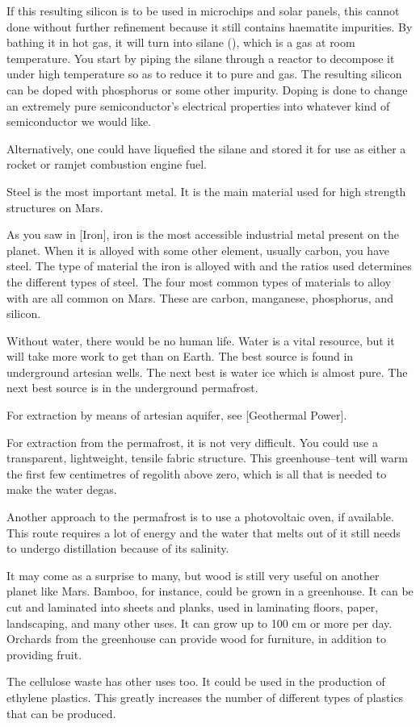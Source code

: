 If this resulting silicon is to be used in microchips and solar panels, this cannot done without further refinement because it still contains haematite impurities. By bathing it in hot  gas, it will turn into silane (), which is a gas at room temperature. You start by piping the silane through a reactor to decompose it under high temperature so as to reduce it to pure  and  gas. The resulting silicon can be doped with phosphorus or some other impurity. Doping is done to change an extremely pure semiconductor's electrical properties into whatever kind of semiconductor we would like.

Alternatively, one could have liquefied the silane and stored it for use as either a rocket or ramjet combustion engine fuel.

Steel is the most important metal. It is the main material used for high strength structures on Mars. 

As you saw in [Iron], iron is the most accessible industrial metal present on the planet. When it is alloyed with some other element, usually carbon, you have steel. The type of material the iron is alloyed with and the ratios used determines the different types of steel. The four most common types of materials to alloy with are all common on Mars. These are carbon, manganese, phosphorus, and silicon.

Without water, there would be no human life. Water is a vital resource, but it will take more work to get than on Earth. The best source is found in underground artesian wells. The next best is water ice which is almost pure. The next best source is in the underground permafrost.

For extraction by means of artesian aquifer, see [Geothermal Power].

For extraction from the permafrost, it is not very difficult. You could use a transparent, lightweight, tensile fabric structure. This greenhouse--tent will warm the first few centimetres of regolith above zero, which is all that is needed to make the water degas. 

Another approach to the permafrost is to use a photovoltaic oven, if available. This route requires a lot of energy and the water that melts out of it still needs to undergo distillation because of its salinity.

It may come as a surprise to many, but wood is still very useful on another planet like Mars. Bamboo, for instance, could be grown in a greenhouse. It can be cut and laminated into sheets and planks, used in laminating floors, paper, landscaping, and many other uses. It can grow up to 100 cm or more per day. Orchards from the greenhouse can provide wood for furniture, in addition to providing fruit. 

The cellulose waste has other uses too. It could be used in the production of ethylene plastics. This greatly increases the number of different types of plastics that can be produced. 
